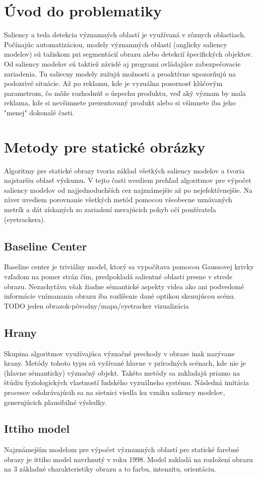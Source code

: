 \section{Úvod do problematiky}
Saliency a teda detekcia významných oblastí je využívaná v rôznych oblastiach. Počínajúc automatizáciou, modely významných oblastí (anglicky saliency modelov) sú tažiskom pri segmentácií obrazu alebo detekcií špecifických objektov. Od saliency modelov sú taktiež závislé aj programi ovládajúce zabezpečovacie zariadenia. Tu saliecny modely zužujú možnosti a proaktívne upozorňujú na podozrivé situácie. Až po reklamu, kde je vyzuálna pozornosť klúčovým parametrom, čo môže rozhodnúť o úspechu produktu, veď aký význam by mala reklama, kde si nevšimnete prezentovaný produkt alebo si všimnete iba jeho "menej" dokonalé časti.
\section{Metody pre statické obrázky}
Algoritmy pre statické obrazy tvoria základ všetkých saliency modelov a tvoria najstaršiu oblasť výskumu. V tejto časti uvediem prehľad algoritmov pre výpočet saliency modelov od najjednoduchších cez najznámejšie až po nejefektívnejšie. Na záver uvediem porovnanie všetkých metód pomocou všeobecne uznávaných metrík a dát získaných zo zariadení merajúcich pohyb očí používateľa (eyetrackera).
\subsection{Baseline Center}\label{section:caseline-center}
Baseline center je triviálny model,  ktorý sa vypočítava pomocou Gaussovej krivky vzľadom na pomer strán čím, predpokladá salientné oblasti presne v strede obrazu. Nezachytáva však žiadne sémantické aspekty videa ako ani podvedomé informácie vnímanania obrazu iba rozlíšenie dané optikou skenujúcou scénu.
TODO jeden obrazok-pôvodny/mapa/eyetracker vizualizácia
\subsection{Hrany}
Skupina algoritmov využívajúca význačné prechody v obraze inak nazývane hrany. Metódy tohoto typu sú vyžívané hlavne v prírodných scénach, kde nie je (hlavne sémanticky) význačný objekt. Takéto metódy sa zakladajú priamo na štúdiu fyziologických vlastností ľudského vyzuálneho systému. Následná imitácia procesov odohrávajúcih sa na sietnici viedla ku vzniku saliency modelov, generujúcich plausibilné výsledky\cite{edges-1}.
\subsection{Ittiho model}
Najznámejším modelom pre výpočet významných oblastí pre statické farebné obrazy je ittiho model navrhnutý v roku 1998. Model zakladá na rozložení obrazu na 3 základné charakteristiky obrazu a to farbu, intenzitu, orientáciu.

